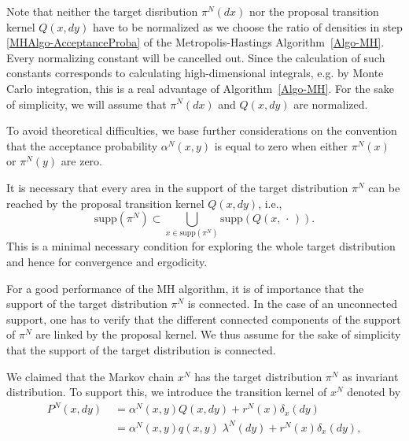 \begin{rem}
\label{Rem-Omitting constants in densities}
 Note that neither the target disribution $ \pi^{N}(dx) $ nor the proposal transition kernel $ Q(x,dy) $ have to be normalized as we choose the ratio of densities in step \ref{MHAlgo-AcceptanceProba} of the Metropolis-Hastings Algorithm~\ref{Algo-MH}. Every normalizing constant will be cancelled out. Since the calculation of such constants corresponds to calculating high-dimensional integrals, e.g. by Monte Carlo integration, this is a real advantage of Algorithm~\ref{Algo-MH}. For the sake of simplicity, we will assume that $ \pi^{N}(dx) $ and $ Q(x,dy) $ are normalized.
\end{rem}

To avoid theoretical difficulties, we base further considerations on the convention that the acceptance probability $ \alpha^{N}(x,y) $ is equal to zero when either $ \pi^{N}(x) $ or $ \pi^{N}(y) $ are zero.

\begin{rem}
\label{Rem-SupportOfProposals}
It is necessary that every area in the support of the target distribution $ \pi^{N} $ can be reached by the proposal transition kernel $ Q(x,dy) $, i.e.,
\begin{equation*}
 \text{supp} (\pi^{N}) \subset \bigcup_{x \in \text{supp} (\pi^{N}) } \text{supp} (Q(x, \, \cdot \,)).
\end{equation*}
This is a minimal necessary condition for exploring the whole target distribution and hence for convergence and ergodicity.

For a good performance of the MH algorithm, it is of importance that the support of the target distribution $ \pi^{N} $ is connected. In the case of an unconnected support, one has to verify that the different connected components of the support of $ \pi^{N} $ are linked by the proposal kernel. We thus assume for the sake of simplicity that the support of the target distribution is connected.
\end{rem}


We claimed that the Markov chain $ x^{N} $ has the target distribution $ \pi^{N} $ as invariant distribution. To support this, we introduce the transition kernel of $ x^{N} $ denoted by
\begin{equation}
\label{MH-TransitionKernelOfMHChain}
\begin{split}
 P^{N}(x,dy) & \; = \alpha^{N}(x,y) Q(x, dy) + r^{N}(x)\delta_{x}(dy) \\
 & \; = \alpha^{N}(x,y) q(x,y) \; \lambda^{N}(dy) + r^{N}(x)\delta_{x}(dy),
\end{split}
\end{equation}

